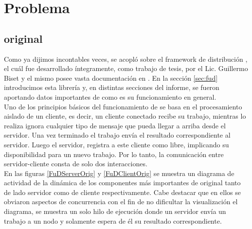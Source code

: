 \chapter{Problema}


\section{\fud{} original}

Como ya dijimos incontables veces, \rc{} se acopló sobre el framework de distribución \fud, el cuál fue desarrollado
íntegramente, como trabajo de tesis, por el Lic. Guillermo Biset y el mismo posee vasta documentación en \cite{clus09}.
En la sección \ref{sec:fud} introducimos esta librería y, en distintas secciones del informe, se fueron aportando datos
importantes de como es su funcionamiento en general.\\

Uno de los principios básicos del funcionamiento de \fud{} se basa en el procesamiento aislado de un cliente, es decir,
un cliente conectado recibe su trabajo, mientras lo realiza ignora cualquier tipo de mensaje que pueda llegar a arriba
desde el servidor. Una vez terminado el trabajo envía el resultado correspondiente al servidor. Luego el servidor,
registra a este cliente como libre, implicando su disponibilidad para un nuevo trabajo. Por lo tanto, la comunicación
entre servidor-cliente consta de solo dos interacciones.\\

En las figuras \ref{FuDServerOrig} y \ref{FuDClientOrig} se muestra un diagrama de actividad de la dinámica de los
componentes más importantes de \fud{} original tanto de lado servidor como de cliente respectivamente. Cabe destacar
que en ellos se obviaron aspectos de concurrencia con el fin de no dificultar la visualización el diagrama, se muestra
un solo hilo de ejecución donde un servidor envía un trabajo a un nodo y solamente espera de él su resultado
correspondiente.

